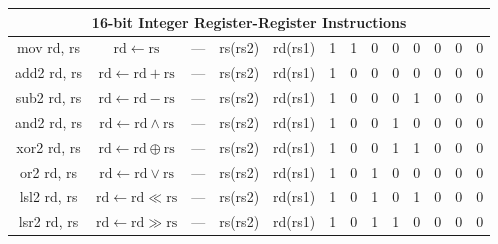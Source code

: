 \documentclass[a4paper,10pt]{article}
\begin{document}
\begin{landscape}
\begin{longtable}[c]{|c|c|@{}c@{}|@{}c@{}|@{}c@{}|@{}c@{}|@{}c@{}|@{}c@{}|@{}c@{}|@{}c@{}|@{}c@{}|@{}c@{}|@{}c@{}|@{}c@{}|@{}c@{}|@{}c@{}|@{}c@{}|@{}c@{}|@{}c@{}|@{}c@{}|@{}c@{}|@{}c@{}|@{}c@{}|@{}c@{}|@{}c@{}|@{}c@{}|}
\hline
\multicolumn{26}{|c|}{16-bit Integer Register-Register Instructions}                                                                                                                                                                                                                                                             \\\hline
mov rd, rs            & $\mathrm{rd} \leftarrow \mathrm{rs}$ & \multicolumn{8}{c|}{---}                                   & \multicolumn{4}{c|}{rs(rs2)}        & \multicolumn{4}{c|}{rd(rs1)} & 1                & 1                & 0   & 0   & 0   & 0 & 0 & 0 \\
add2 rd, rs           & $\mathrm{rd} \leftarrow \mathrm{rd} + \mathrm{rs}$ & \multicolumn{8}{c|}{---}                                   & \multicolumn{4}{c|}{rs(rs2)}        & \multicolumn{4}{c|}{rd(rs1)} & 1                & 0                & 0   & 0   & 0   & 0 & 0 & 0 \\
sub2 rd, rs           & $\mathrm{rd} \leftarrow \mathrm{rd} - \mathrm{rs}$ & \multicolumn{8}{c|}{---}                                   & \multicolumn{4}{c|}{rs(rs2)}        & \multicolumn{4}{c|}{rd(rs1)} & 1                & 0                & 0   & 0   & 1   & 0 & 0 & 0 \\
and2 rd, rs           & $\mathrm{rd} \leftarrow \mathrm{rd} \land \mathrm{rs}$ & \multicolumn{8}{c|}{---}                                   & \multicolumn{4}{c|}{rs(rs2)}        & \multicolumn{4}{c|}{rd(rs1)} & 1                & 0                & 0   & 1   & 0   & 0 & 0 & 0 \\
xor2 rd, rs           & $\mathrm{rd} \leftarrow \mathrm{rd} \oplus \mathrm{rs}$ & \multicolumn{8}{c|}{---}                                   & \multicolumn{4}{c|}{rs(rs2)}        & \multicolumn{4}{c|}{rd(rs1)} & 1                & 0                & 0   & 1   & 1   & 0 & 0 & 0 \\
or2 rd, rs            & $\mathrm{rd} \leftarrow \mathrm{rd} \lor \mathrm{rs}$ & \multicolumn{8}{c|}{---}                                   & \multicolumn{4}{c|}{rs(rs2)}        & \multicolumn{4}{c|}{rd(rs1)} & 1                & 0                & 1   & 0   & 0   & 0 & 0 & 0 \\
lsl2 rd, rs           & $\mathrm{rd} \leftarrow \mathrm{rd} \ll \mathrm{rs}$ & \multicolumn{8}{c|}{---}                                   & \multicolumn{4}{c|}{rs(rs2)}        & \multicolumn{4}{c|}{rd(rs1)} & 1                & 0                & 1   & 0   & 1   & 0 & 0 & 0 \\
lsr2 rd, rs           & $\mathrm{rd} \leftarrow \mathrm{rd} \gg \mathrm{rs}$ & \multicolumn{8}{c|}{---}                                   & \multicolumn{4}{c|}{rs(rs2)}        & \multicolumn{4}{c|}{rd(rs1)} & 1                & 0                & 1   & 1   & 0   & 0 & 0 & 0 \\

\end{longtable}
\end{landscape}
\end{document}
